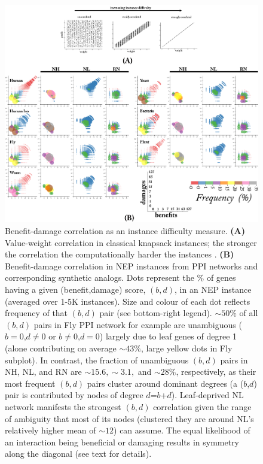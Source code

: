 \documentclass[12pt]{article}
\begin{document}
\begin{figure}[H]%
    \includegraphics[width=\textwidth]{Figure4.png}
    \caption{
                Benefit-damage correlation as an instance difficulty measure. \textbf{(A)} Value-weight correlation
                in classical knapsack instances;  the stronger the correlation the computationally harder the instances \cite{pisinger_where_2005}. \textbf{(B)} Benefit-damage correlation in NEP instances from PPI networks and corresponding synthetic analogs. Dots represent the \% of genes having a given (benefit,damage) score, $(b,d)$, in an NEP instance (averaged over 1-5K instances). Size and colour of each dot reflects frequency of that $(b,d)$ pair (see bottom-right legend). ${\sim}50\%$ of all $(b,d)$ pairs in Fly PPI network for example are unambiguous ($b=0$,$d\neq 0$ or $b\neq 0$,$d=0$) largely due to leaf genes of degree 1 (alone contributing on average ${\sim}43\%$, large yellow dots in Fly subplot). In contrast, the fraction of unambiguous $(b,d)$ pairs in NH, NL, and RN are ${\sim}15.6, {\sim}3.1,$ and ${\sim}28 \%$,
                respectively, as their most frequent $(b,d)$ pairs cluster around dominant degrees (a ($b$,$d$) pair is contributed by nodes of degree $d$=$b$+$d$). Leaf-deprived NL network manifests the strongest $(b,d)$ correlation given the range of ambiguity that most of its nodes (clustered they are around NL's relatively higher mean of ${\sim}12$) can assume. The equal likelihood of an interaction being beneficial or damaging results in symmetry along the diagonal (see text for details).
             }
    \label{scatter}
\end{figure}
\end{document}
